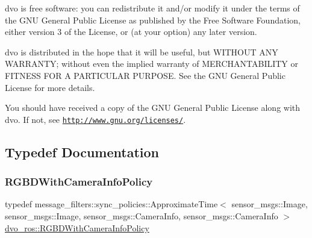 dvo is free software\+: you can redistribute it and/or modify it under the terms of the G\+NU General Public License as published by the Free Software Foundation, either version 3 of the License, or (at your option) any later version.

dvo is distributed in the hope that it will be useful, but W\+I\+T\+H\+O\+UT A\+NY W\+A\+R\+R\+A\+N\+TY; without even the implied warranty of M\+E\+R\+C\+H\+A\+N\+T\+A\+B\+I\+L\+I\+TY or F\+I\+T\+N\+E\+SS F\+OR A P\+A\+R\+T\+I\+C\+U\+L\+AR P\+U\+R\+P\+O\+SE. See the G\+NU General Public License for more details.

You should have received a copy of the G\+NU General Public License along with dvo. If not, see \href{http://www.gnu.org/licenses/}{\tt http\+://www.\+gnu.\+org/licenses/}. 

\subsection{Typedef Documentation}
\mbox{\label{namespacedvo__ros_ae8c4d74734d4ef3107bf429ef461e553}} 
\subsubsection{\texorpdfstring{R\+G\+B\+D\+With\+Camera\+Info\+Policy}{RGBDWithCameraInfoPolicy}}
{\footnotesize\ttfamily typedef message\+\_\+filters\+::sync\+\_\+policies\+::\+Approximate\+Time$<$ sensor\+\_\+msgs\+::\+Image, sensor\+\_\+msgs\+::\+Image, sensor\+\_\+msgs\+::\+Camera\+Info, sensor\+\_\+msgs\+::\+Camera\+Info $>$ \mbox{\hyperlink{namespacedvo__ros_ae8c4d74734d4ef3107bf429ef461e553}{dvo\+\_\+ros\+::\+R\+G\+B\+D\+With\+Camera\+Info\+Policy}}}

